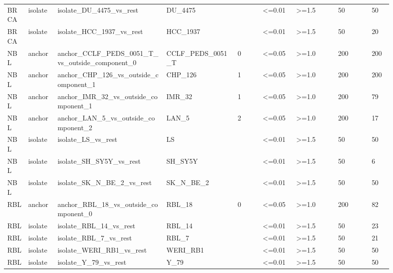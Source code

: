 \begin{landscape}
{\begin{longtable}{p{0.05\linewidth}p{0.07\linewidth}p{0.26\linewidth}p{0.17\linewidth}p{0.06\linewidth}p{0.08\linewidth}p{0.10\linewidth}p{0.08\linewidth}p{0.05\linewidth}}
BRCA & isolate & isolate\_\allowbreak{}DU\_\allowbreak{}4475\_\allowbreak{}vs\_\allowbreak{}rest & DU\_\allowbreak{}4475 &  & <=0.01 & >=1.5 & 50 & 50 \\
BRCA & isolate & isolate\_\allowbreak{}HCC\_\allowbreak{}1937\_\allowbreak{}vs\_\allowbreak{}rest & HCC\_\allowbreak{}1937 &  & <=0.01 & >=1.5 & 50 & 20 \\
NBL & anchor & anchor\_\allowbreak{}CCLF\_\allowbreak{}PEDS\_\allowbreak{}0051\_\allowbreak{}T\_\allowbreak{}vs\_\allowbreak{}outside\_\allowbreak{}component\_\allowbreak{}0 & CCLF\_\allowbreak{}PEDS\_\allowbreak{}0051\_\allowbreak{}T & 0 & <=0.05 & >=1.0 & 200 & 200 \\
NBL & anchor & anchor\_\allowbreak{}CHP\_\allowbreak{}126\_\allowbreak{}vs\_\allowbreak{}outside\_\allowbreak{}component\_\allowbreak{}1 & CHP\_\allowbreak{}126 & 1 & <=0.05 & >=1.0 & 200 & 200 \\
NBL & anchor & anchor\_\allowbreak{}IMR\_\allowbreak{}32\_\allowbreak{}vs\_\allowbreak{}outside\_\allowbreak{}component\_\allowbreak{}1 & IMR\_\allowbreak{}32 & 1 & <=0.05 & >=1.0 & 200 & 79 \\
NBL & anchor & anchor\_\allowbreak{}LAN\_\allowbreak{}5\_\allowbreak{}vs\_\allowbreak{}outside\_\allowbreak{}component\_\allowbreak{}2 & LAN\_\allowbreak{}5 & 2 & <=0.05 & >=1.0 & 200 & 17 \\
NBL & isolate & isolate\_\allowbreak{}LS\_\allowbreak{}vs\_\allowbreak{}rest & LS &  & <=0.01 & >=1.5 & 50 & 50 \\
NBL & isolate & isolate\_\allowbreak{}SH\_\allowbreak{}SY5Y\_\allowbreak{}vs\_\allowbreak{}rest & SH\_\allowbreak{}SY5Y &  & <=0.01 & >=1.5 & 50 & 6 \\
NBL & isolate & isolate\_\allowbreak{}SK\_\allowbreak{}N\_\allowbreak{}BE\_\allowbreak{}2\_\allowbreak{}vs\_\allowbreak{}rest & SK\_\allowbreak{}N\_\allowbreak{}BE\_\allowbreak{}2 &  & <=0.01 & >=1.5 & 50 & 50 \\
RBL & anchor & anchor\_\allowbreak{}RBL\_\allowbreak{}18\_\allowbreak{}vs\_\allowbreak{}outside\_\allowbreak{}component\_\allowbreak{}0 & RBL\_\allowbreak{}18 & 0 & <=0.05 & >=1.0 & 200 & 82 \\
RBL & isolate & isolate\_\allowbreak{}RBL\_\allowbreak{}14\_\allowbreak{}vs\_\allowbreak{}rest & RBL\_\allowbreak{}14 &  & <=0.01 & >=1.5 & 50 & 23 \\
RBL & isolate & isolate\_\allowbreak{}RBL\_\allowbreak{}7\_\allowbreak{}vs\_\allowbreak{}rest & RBL\_\allowbreak{}7 &  & <=0.01 & >=1.5 & 50 & 21 \\
RBL & isolate & isolate\_\allowbreak{}WERI\_\allowbreak{}RB1\_\allowbreak{}vs\_\allowbreak{}rest & WERI\_\allowbreak{}RB1 &  & <=0.01 & >=1.5 & 50 & 50 \\
RBL & isolate & isolate\_\allowbreak{}Y\_\allowbreak{}79\_\allowbreak{}vs\_\allowbreak{}rest & Y\_\allowbreak{}79 &  & <=0.01 & >=1.5 & 50 & 50 \\
\end{longtable}
}
\end{landscape}

